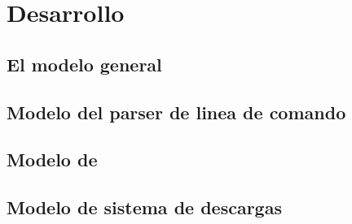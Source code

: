 \section{Desarrollo}

\subsection{El modelo general}

\subsection{Modelo del parser de linea de comando}

\subsection{Modelo de \conffiles}

\subsection{Modelo de sistema de descargas}
